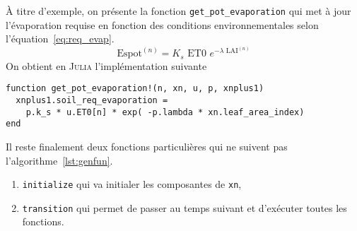 
À titre d'exemple, on présente la fonction \lstinline|get_pot_evaporation| qui met
à jour l'évaporation requise en fonction des conditions environnementales
selon l'équation~\ref{eq:req_evap}.
\begin{equation}
  \text{Espot}^{(n)} = K_s \text{ ET0 } e^{-\lambda \text{ LAI}^{(n)}}
  \label{eq:req_evap}
\end{equation}
On obtient en \textsc{Julia} l'implémentation suivante
\begin{lstlisting}
function get_pot_evaporation!(n, xn, u, p, xnplus1)
  xnplus1.soil_req_evaporation = 
    p.k_s * u.ET0[n] * exp( -p.lambda * xn.leaf_area_index) 
end
\end{lstlisting}

Il reste finalement deux fonctions particulières qui ne suivent
pas l'algorithme~\ref{lst:genfun}.

\begin{enumerate}
  \item \lstinline|initialize| qui va initialer les composantes de \lstinline|xn|,
  \item \lstinline|transition| qui permet de passer au temps suivant et d'exécuter toutes les fonctions.
\end{enumerate}


